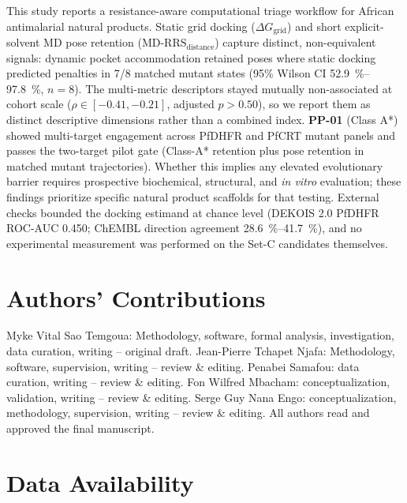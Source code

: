 \documentclass[journal=jcisd8,manuscript=article,layout=traditional]{achemso}
\begin{document}
This study reports a resistance-aware computational triage workflow for African antimalarial natural products. Static grid docking ($\Delta G_{\mathrm{grid}}$) and short explicit-solvent MD pose retention ($\mathrm{MD\text{-}RRS}_{\mathrm{distance}}$) capture distinct, non-equivalent signals: dynamic pocket accommodation retained poses where static docking predicted penalties in 7/8 matched mutant states (95\% Wilson CI \qtyrange{52.9}{97.8}{\percent}, $n=\num{8}$). The multi-metric descriptors stayed mutually non-associated at cohort scale ($\rho \in [-0.41, -0.21]$, adjusted $p > 0.50$), so we report them as distinct descriptive dimensions rather than a combined index. \textbf{PP-01} (Class A*) showed multi-target engagement across PfDHFR and PfCRT mutant panels and passes the two-target pilot gate (Class-A* retention plus pose retention in matched mutant trajectories). Whether this implies any elevated evolutionary barrier requires prospective biochemical, structural, and \textit{in vitro} evaluation; these findings prioritize specific natural product scaffolds for that testing. External checks bounded the docking estimand at chance level (DEKOIS 2.0 PfDHFR ROC-AUC \num{0.450}; ChEMBL direction agreement \qtyrange{28.6}{41.7}{\percent}), and no experimental measurement was performed on the Set-C candidates themselves.


\section*{Authors' Contributions}

Myke Vital Sao Temgoua: Methodology, software, formal analysis, investigation, data curation, writing -- original draft. Jean-Pierre Tchapet Njafa: Methodology, software, supervision, writing -- review \& editing. Penabei Samafou: data curation, writing -- review \& editing. Fon Wilfred Mbacham: conceptualization, validation, writing -- review \& editing. Serge Guy Nana Engo: conceptualization, methodology, supervision, writing -- review \& editing. All authors read and approved the final manuscript.

\section*{Data Availability}
\end{document}
